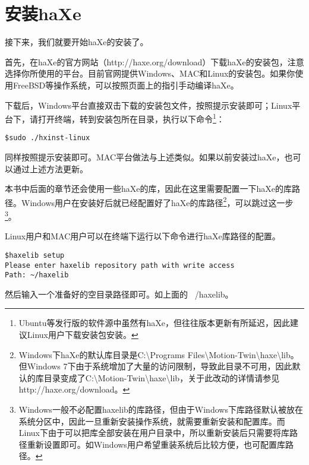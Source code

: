 \section{安装haXe}
接下来，我们就要开始haXe的安装了。

首先，在haXe的官方网站（http://haxe.org/download）下载haXe的安装包，注意选择你所使用的平台。目前官网提供Windows、MAC和Linux的安装包。如果你使用FreeBSD等操作系统，可以按照页面上的指引手动编译haXe。

下载后，Windows平台直接双击下载的安装包文件，按照提示安装即可；Linux平台下，请打开终端，转到安装包所在目录，执行以下命令\footnote{Ubuntu等发行版的软件源中虽然有haXe，但往往版本更新有所延迟，因此建议Linux用户下载安装包安装。}：
\begin{lstlisting}
$sudo ./hxinst-linux
\end{lstlisting}
同样按照提示安装即可。MAC平台做法与上述类似。如果以前安装过haXe，也可以通过上述方法更新。

本书中后面的章节还会使用一些haXe的库，因此在这里需要配置一下haXe的库路径。Windows用户在安装好后就已经配置好了haXe的库路径\footnote{Windows下haXe的默认库目录是C:{\textbackslash}Programs Files{\textbackslash}Motion-Twin{\textbackslash}haxe{\textbackslash}lib。但Windows 7下由于系统增加了大量的访问限制，导致此目录不可用，因此默认的库目录变成了C:{\textbackslash}Motion-Twin{\textbackslash}haxe{\textbackslash}lib，关于此改动的详情请参见http://haxe.org/download。}，可以跳过这一步\footnote{Windows一般不必配置haxelib的库路径，但由于Windows下库路径默认被放在系统分区中，因此一旦重新安装操作系统，就需要重新安装和配置库。而Linux下由于可以把库全部安装在用户目录中，所以重新安装后只需要将库路径重新设置即可。如Windows用户希望重装系统后比较方便，也可配置库路径。}。

Linux用户和MAC用户可以在终端下运行以下命令进行haXe库路径的配置。

\begin{lstlisting}
$haxelib setup
Please enter haxelib repository path with write access 
Path: ~/haxelib
\end{lstlisting}

然后输入一个准备好的空目录路径即可。如上面的 ~/haxelib。
